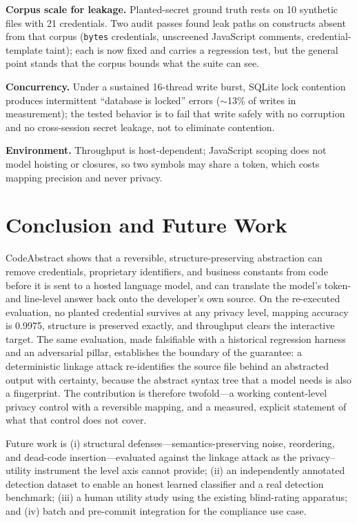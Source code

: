 \documentclass[conference]{IEEEtran}
\begin{document}
\textbf{Corpus scale for leakage.} Planted-secret ground truth rests on 10
synthetic files with 21 credentials. Two audit passes found leak paths on
constructs absent from that corpus (\texttt{bytes} credentials, unscreened
JavaScript comments, credential-template taint); each is now fixed and
carries a regression test, but the general point stands that the corpus
bounds what the suite can see.

\textbf{Concurrency.} Under a sustained 16-thread write burst, SQLite lock
contention produces intermittent ``database is locked'' errors
($\sim$13\% of writes in measurement); the tested behavior is to fail
that write safely with no corruption and no cross-session secret leakage,
not to eliminate contention.

\textbf{Environment.} Throughput is host-dependent; JavaScript scoping
does not model hoisting or closures, so two symbols may share a token,
which costs mapping precision and never privacy.

\section{Conclusion and Future Work}

CodeAbstract shows that a reversible, structure-preserving abstraction can
remove credentials, proprietary identifiers, and business constants from
code before it is sent to a hosted language model, and can translate the
model's token- and line-level answer back onto the developer's own source.
On the re-executed evaluation, no planted credential survives at any
privacy level, mapping accuracy is 0.9975, structure is preserved exactly,
and throughput clears the interactive target. The same evaluation, made
falsifiable with a historical regression harness and an adversarial
pillar, establishes the boundary of the guarantee: a deterministic linkage
attack re-identifies the source file behind an abstracted output with
certainty, because the abstract syntax tree that a model needs is also a
fingerprint. The contribution is therefore twofold---a working
content-level privacy control with a reversible mapping, and a measured,
explicit statement of what that control does not cover.

Future work is (i) structural defenses---semantics-preserving noise,
reordering, and dead-code insertion---evaluated against the linkage attack
as the privacy--utility instrument the level axis cannot provide; (ii) an
independently annotated detection dataset to enable an honest learned
classifier and a real detection benchmark; (iii) a human utility study
using the existing blind-rating apparatus; and (iv) batch and pre-commit
integration for the compliance use case.
\end{document}
